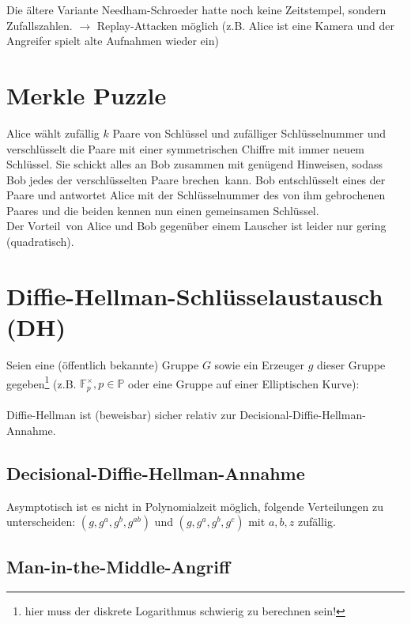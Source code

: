 \documentclass[a4paper,twoside,DIV15,BCOR12mm]{scrbook}
\begin{document}
Die ältere Variante Needham-Schroeder hatte noch keine Zeitstempel, sondern Zufallszahlen. $\rightarrow$ Replay-Attacken möglich (z.B. Alice ist eine Kamera und der Angreifer spielt alte Aufnahmen wieder ein)

\section{Merkle Puzzle}

Alice wählt zufällig $k$ Paare von Schlüssel und zufälliger Schlüsselnummer und verschlüsselt die Paare mit einer symmetrischen Chiffre mit immer neuem Schlüssel. Sie schickt alles an Bob zusammen mit genügend Hinweisen, sodass Bob jedes der verschlüsselten Paare \glqq brechen\grqq\ kann. Bob entschlüsselt eines der Paare und antwortet Alice mit der Schlüsselnummer des von ihm gebrochenen Paares und die beiden kennen nun einen gemeinsamen Schlüssel.\\ Der \glqq Vorteil\grqq\ von Alice und Bob gegenüber einem Lauscher ist leider nur gering (quadratisch).

\section{Diffie-Hellman-Schlüsselaustausch (DH)}

Seien eine (öffentlich bekannte) Gruppe $G$ sowie ein Erzeuger $g$ dieser Gruppe gegeben\footnote{hier muss der diskrete Logarithmus schwierig zu berechnen sein!} (z.B. $\mathbb{F}_p^\times, p \in \mathbb{P}$ oder eine Gruppe auf einer Elliptischen Kurve):\\

\\

Diffie-Hellman ist (beweisbar) sicher relativ zur Decisional-Diffie-Hellman-Annahme.

\subsection{Decisional-Diffie-Hellman-Annahme}

Asymptotisch ist es nicht in Polynomialzeit möglich, folgende Verteilungen zu unterscheiden: $(g, g^a, g^b, g^{ab})$ und $(g, g^a, g^b, g^c)$ mit $a, b, z$ zufällig.

\subsection{Man-in-the-Middle-Angriff}
\end{document}
